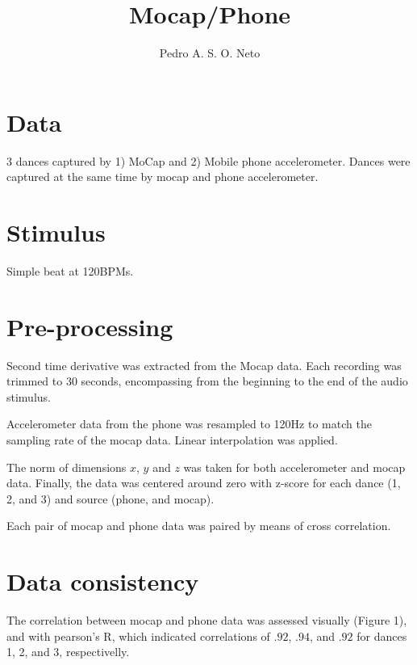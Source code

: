 \documentclass{article}
\title{Mocap/Phone}
\author{Pedro A. S. O. Neto}
\begin{document}
\maketitle

\section{Data}

3 dances captured by 1) MoCap and 2) Mobile phone accelerometer. Dances were captured at the same time by mocap and phone accelerometer.

\section{Stimulus}

Simple beat at 120BPMs.

\section{Pre-processing}

Second time derivative was extracted from the Mocap data. Each recording was trimmed to 30 seconds, encompassing from the beginning to the end of the audio stimulus. 

Accelerometer data from the phone was resampled to 120Hz to match the sampling rate of the mocap data. Linear interpolation was applied.

The norm of dimensions $x$, $y$ and $z$ was taken for both accelerometer and mocap data. Finally, the data was centered around zero with z-score for each dance (1, 2, and 3) and source (phone, and mocap).

Each pair of mocap and phone data was paired by means of cross correlation.

\section{Data consistency}

The correlation between mocap and phone data was assessed visually (Figure 1), and with pearson's R, which indicated correlations of $.92$, $.94$, and $.92$ for dances 1, 2, and 3, respectivelly.
\end{document}
